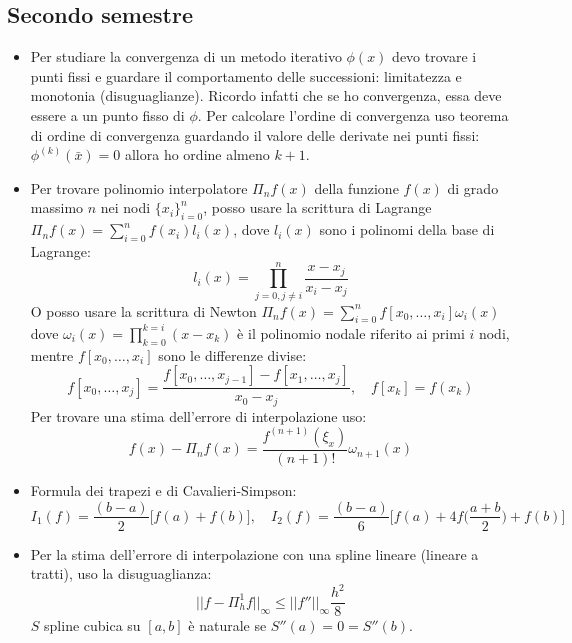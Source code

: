 \documentclass[a4paper,10pt]{article}
\theoremstyle{definition}
\theoremstyle{indentdefinition}
\theoremstyle{indenttheorem}
\theoremstyle{myremark}
\theoremstyle{indentgeneral}
\theoremstyle{plain}
\theoremstyle{plain}
\begin{document}
\subsection{Secondo semestre}
\begin{itemize}

    \item Per studiare la convergenza di un metodo iterativo $\phi(x)$ devo trovare i punti fissi e guardare il comportamento delle successioni: limitatezza e monotonia (disuguaglianze).
    Ricordo infatti che se ho convergenza, essa deve essere a un punto fisso di $\phi$.
    Per calcolare l'ordine di convergenza uso teorema di ordine di convergenza guardando il valore delle derivate nei punti fissi: $\phi^{(k)}(\bar x)=0$ allora ho ordine almeno $k+1$.
    
    \item Per trovare polinomio interpolatore $\Pi_nf(x)$ della funzione $f(x)$ di grado massimo $n$ nei nodi $\{x_i\}_{i=0}^n$, posso usare la scrittura di Lagrange
    $\Pi_nf(x) = \sum_{i=0}^nf(x_i)l_i(x)$, dove $l_i(x)$ sono i polinomi della base di Lagrange:
    \[
    l_i(x) = \prod_{j=0,j\ne i}^n \frac{x-x_j}{x_i - x_j}
    \]
    O posso usare la scrittura di Newton
    $\Pi_nf(x) = \sum_{i=0}^{n}f[x_0,\dots,x_i]\omega_i(x)$ dove
    $\omega_i(x) = \prod_{k=0}^{k=i}(x-x_k)$ è il polinomio nodale riferito ai primi $i$ nodi, mentre $f[x_0,\dots,x_i]$ sono le differenze divise:
    \[
    f[x_0,\dots,x_j] = \frac{f[x_0,\dots,x_{j-1}]-f[x_1,\dots,x_j]}{x_0-x_j},\quad
    f[x_k] = f(x_k)
    \]
    Per trovare una stima dell'errore di interpolazione uso:
    \[
    f(x) - \Pi_nf(x) = \frac{f^{(n+1)}(\xi_x)}{(n+1)!}\omega_{n+1}(x)
    \]
    
    \item Formula dei trapezi e di Cavalieri-Simpson:
    \[
    I_1(f) = \frac{(b-a)}{2}\bigg[ f(a) + f(b) \bigg], \quad
    I_2(f) = \frac{(b-a)}{6}\bigg[ f(a) + 4f\bigg( \frac{a+b}{2} \bigg) + f(b) \bigg]
    \]
    
    \item Per la stima dell'errore di interpolazione con una spline lineare (lineare a tratti), uso la disuguaglianza:
    \[
    ||f-\Pi_h^1f||_\infty \le ||f''||_\infty\frac{h^2}{8}
    \]
    $S$ spline cubica su $[a,b]$ è naturale se $S''(a) = 0 = S''(b)$.


\end{itemize}
\end{document}
